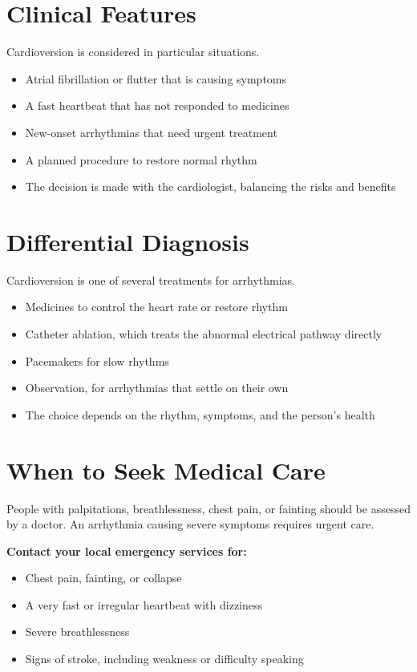 \section*{Clinical Features}
Cardioversion is considered in particular situations.
\begin{itemize}
    \item Atrial fibrillation or flutter that is causing symptoms
    \item A fast heartbeat that has not responded to medicines
    \item New-onset arrhythmias that need urgent treatment
    \item A planned procedure to restore normal rhythm
    \item The decision is made with the cardiologist, balancing the risks and benefits
\end{itemize}

\section*{Differential Diagnosis}
Cardioversion is one of several treatments for arrhythmias.
\begin{itemize}
    \item Medicines to control the heart rate or restore rhythm
    \item Catheter ablation, which treats the abnormal electrical pathway directly
    \item Pacemakers for slow rhythms
    \item Observation, for arrhythmias that settle on their own
    \item The choice depends on the rhythm, symptoms, and the person's health
\end{itemize}

\section*{When to Seek Medical Care}
People with palpitations, breathlessness, chest pain, or fainting should be assessed by a doctor. An arrhythmia causing severe symptoms requires urgent care.

\textbf{Contact your local emergency services for:}
\begin{itemize}
    \item Chest pain, fainting, or collapse
    \item A very fast or irregular heartbeat with dizziness
    \item Severe breathlessness
    \item Signs of stroke, including weakness or difficulty speaking
\end{itemize}

